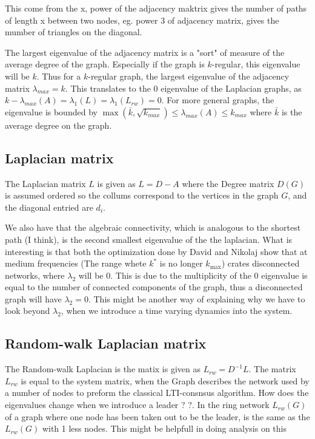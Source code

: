 \documentclass[fleqn,10pt]{wlscirep}
\begin{document}
This come from the x, power of the adjacency maktrix gives the number of paths of length x between two nodes, eg. power 3 of adjacency matrix, gives the mumber of triangles on the diagonal. 

The largest eigenvalue of the adjacency matrix is a "sort" of measure of the average degree of the graph. Especially if the graph is $k$-regular, this eigenvalue will be $k$.  Thus for a $k$-regular graph, the largest eigenvalue of the adjacency matrix $
\lambda_{max} = k$. This translates to the 0 eigenvalue of the Laplacian graphs, as $k-\lambda_{max}(A) = \lambda_1(L) =  \lambda_1(L_{rw}) = 0$.  For more general graphs, the eigenvalue is bounded by $\max(\bar{k},\sqrt{k_{max}}) \leq \lambda_{max}(A) \leq k_{max}$ where $\bar{k}$ is the average degree on the graph. 



\subsection*{Laplacian matrix}
The Laplacian matrix $L$ is given as $L = D-A$ where the Degree matrix $D(G)$ is assumed ordered so the collums correspond to the vertices in the graph $G$, and the diagonal entried are $d_i$. 

We also have that the algebraic connectivity, which is analogous to the shortest path (I think), is the second smallest eigenvalue of the the laplacian. What is interesting is that both the optimization done by David and Nikolaj show that at medium frequencies (The range whete $k^*$ is no longer $k_{\text{max}} $) crates disconnected networks, where $\lambda_2$ will be 0. This is due to the multiplicity of the 0 eigenvalue is equal to the number of connected components of the graph, thus a disconnected graph will have $\lambda_2 = 0$. This might be another way of explaining why we have to look beyond $\lambda_2$, when we introduce a time varying dynamics into the system.

\subsection*{Random-walk Laplacian matrix}
The Random-walk Laplacian is the matix is given as $L_{rw} = D^{-1} L$. The matrix $L_{rw}$ is equal to the system matrix, when the Graph describes the network used by a number of nodes to preform the classical LTI-consnsus algorithm.  How does the eigenvalues change when we introduce a leader ? ?.
In the ring network $L_{rw}(G)$ of a graph where one node has been taken out to be the leader, is the same as the $L_{rw}(G)$ with 1 less nodes. This might be helpfull in doing analysis on this
\end{document}
